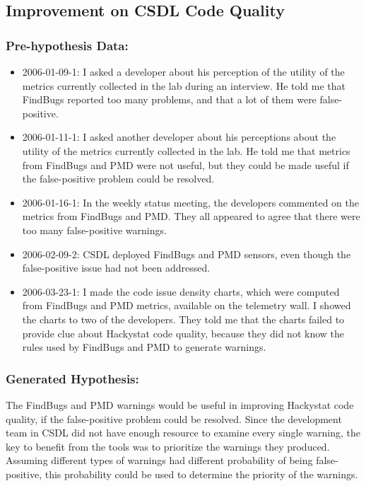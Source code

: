\subsection{Improvement on CSDL Code Quality}
\label{EvaluationInCSDL:EventsDescription:CodeIssue}

\subsubsection{Pre-hypothesis Data:}
\begin{itemize}
  \setlength{\itemsep}{0pt}
  \setlength{\parskip}{0pt}
  \item 2006-01-09-1: I asked a developer about his perception of the utility of the metrics currently collected in the lab during an interview. He told me that FindBugs reported too many problems, and that a lot of them were false-positive.
  \item 2006-01-11-1: I asked another developer about his perceptions about the utility of the metrics currently collected in the lab. He told me that metrics from FindBugs and PMD were not useful, but they could be made useful if the false-positive problem could be resolved. 
  \item 2006-01-16-1: In the weekly status meeting, the developers commented on the metrics from FindBugs and PMD. They all appeared to agree that there were too many false-positive warnings.
  \item 2006-02-09-2: CSDL deployed FindBugs and PMD sensors, even though the false-positive issue had not been addressed.
  \item 2006-03-23-1: I made the code issue density charts, which were computed from FindBugs and PMD metrics, available on the telemetry wall. I showed the charts to two of the developers. They told me that the charts failed to provide clue about Hackystat code quality, because they did not know the rules used by FindBugs and PMD to generate warnings. 
\end{itemize}

\subsubsection{Generated Hypothesis:}

The FindBugs and PMD warnings would be useful in improving Hackystat code quality, if the false-positive problem could be resolved. Since the development team in CSDL did not have enough resource to examine every single warning, the key to benefit from the tools was to prioritize the warnings they produced. Assuming different types of warnings had different probability of being false-positive, this probability could be used to determine the priority of the warnings.

